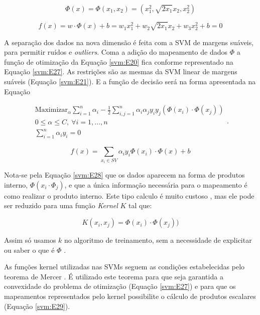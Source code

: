 \begin{equation}\label{svm:E25}
\Phi(x) = \Phi(x_{1},x_{2}) = \left(x_{1}^2,\sqrt{2x_{1}}x_{2},x_{2}^2\right)
\end{equation}

\begin{equation} \label{svm:E26}
f(x) = w \cdot \Phi(x) + b = w_{1}x_{1}^2 + w_{2} \sqrt{2x_{1}}x_{2} + w_{3}x_{2}^2 + b = 0
\end{equation}

A separação dos dados na nova dimensão é feita com a SVM de margens suáveis, para permitir ruídos e \textit{outliers}. Coma a adição do mapeamento de dados $\Phi$ a função de otimização da Equação \ref{svm:E20} fica conforme representado na Equação \ref{svm:E27}. As restrições são as mesmas da SVM linear de margens suáveis (Equação \ref{svm:E21}). E a função de decisão será na forma apresentada na Equação

\begin{equation} \label{svm:E27}
\begin{matrix}
\text{Maximizar}_{\alpha} \sum_{i = 1}^{n} \alpha_{i} - \frac{1}{2} \sum_{i,j = 1}^{n} \alpha_{i}\alpha_{j}y_{i}y_{j}(\Phi(x_{i}) \cdot \Phi(x_{j})) \\ 
0 \leq \alpha \leq C,\  \forall i = 1,...,n \\
\sum_{i = 1}^{n} \alpha_{i}y_{i} = 0
\end{matrix}.
\end{equation}



\begin{equation} \label{svm:E28}
f(x) = \sum_{x_{i} \in SV}\alpha_{i}y_{i}\Phi(x_{i}) \cdot \Phi(x) + b
\end{equation}

Nota-se pela Equação \ref{svm:E28} que os dados aparecem na forma de produtos interno, $\Phi(x_{i} \cdot \Phi_{j})$, e que a única informação necessária para o mapeamento é como realizar o produto interno. Este tipo calculo é muito custoso \cite{Scholkopf2002}, mas ele pode ser reduzido para uma função \textit{Kernel} $K$ tal que:

\begin{equation} \label{svm:E29}
K(x_{i},x_{j}) = \Phi(x_{i}) \cdot \Phi(x_{j}))
\end{equation} 
 
Assim só usamos $k$ no algoritmo de treinamento, sem a necessidade de explicitar ou saber o que é $\Phi$ \cite{Burges1998Support}.

As funções kernel utilizadas nas SVMs seguem as condições estabelecidas pelo teorema de Mercer \cite{Burges1998Support}. É utilizado este teorema para que seja garantida a convexidade do problema de otimização (Equação \ref{svm:E27}) e para que os mapeamentos representados pelo kernel possibilite o cálculo de produtos escalares (Equação \ref{svm:E29}).

